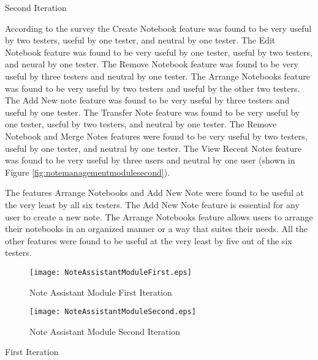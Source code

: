 \begin{flushleft}
Second Iteration
\end{flushleft}

\begin{raggedright}
According to the survey the Create Notebook feature was found to be very useful by two testers, useful by one tester, and neutral by one tester. The Edit Notebook feature was found to be very useful by one tester, useful by two testers, and neural by one tester. The Remove Notebook feature was found to be very useful by three testers and neutral by one tester. The Arrange Notebooks feature was found to be very useful by two testers and useful by the other two testers. The Add New note feature was found to be very useful by three testers and useful by one tester. The Transfer Note feature was found to be very useful by one tester, useful by two testers, and neutral by one tester. The Remove Notebook and Merge Notes features were found to be very useful by two testers, useful by one tester, and neutral by one tester. The View Recent Notes feature was found to be very useful by three users and neutral by one user (shown in Figure \ref{fig:notemanagementmodulesecond}).
\end{raggedright}

The features Arrange Notebooks and Add New Note were found to be useful at the very least by all six testers. The Add New Note feature is essential for any user to create a new note. The Arrange Notebooks feature allows users to arrange their notebooks in an organized manner or a way that suites their needs. All the other features were found to be useful at the very least by five out of the six testers.

\begin{figure}[htbp!]
   \centering
   \texttt{[image: NoteAssistantModuleFirst.eps]} 
   \caption{Note Assistant Module First Iteration}
   \label{fig:noteassistantmodulefirst}
\end{figure}

\pagebreak
\begin{figure}[htbp!]
   \centering
   \texttt{[image: NoteAssistantModuleSecond.eps]} 
   \caption{Note Assistant Module Second Iteration}
   \label{fig:noteassistantmodulesecond}
\end{figure}

\begin{flushleft}
First Iteration
\end{flushleft}

